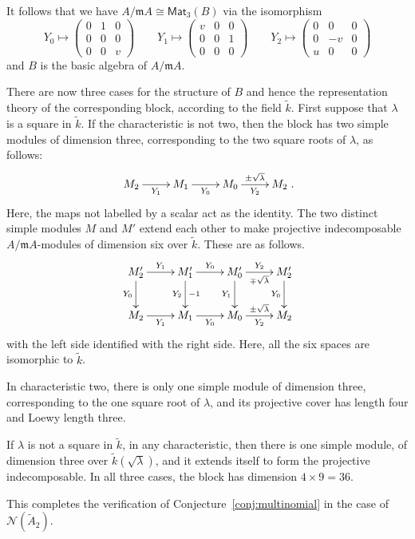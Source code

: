 \documentclass[12pt]{amsart}
\newcommand{\Mat}{\mathsf{Mat}}
\newcommand{\mcN}{\mathcal{N}}
\newcommand{\mfm}{\mathfrak{m}}
\numberwithin{equation}{section}
\theoremstyle{definition}
\begin{document}
It follows that we have $A/\mfm A\cong \Mat_3(B)$ via the isomorphism
\[ Y_0 \mapsto \left(\begin{smallmatrix}
0&1&0\\ 0&0&0 \\ 0&0&v 
\end{smallmatrix}\right)\qquad 
Y_1 \mapsto \left(\begin{smallmatrix}
v&0&0\\ 0&0&1 \\ 0&0&0 
\end{smallmatrix}\right)\qquad 
Y_2 \mapsto \left(\begin{smallmatrix}
0&0&0\\ 0&-v&0 \\ u&0&0 
\end{smallmatrix}\right) \]
and $B$ is the basic algebra of $A/\mfm A$.

There are now
three cases for the structure of $B$ and hence the representation
theory of the corresponding block, according to
the field $\tilde k$. First suppose that $\lambda$ is a square in
$\tilde k$.
If the characteristic is not two, then the block has
two simple modules of dimension three,  corresponding to the
two square roots of $\lambda$, as follows:
\[ \xymatrix{M_2\ar[r]_{Y_1}& M_1\ar[r]_{Y_0}&
    M_0\ar[r]_{Y_2}^{\pm\sqrt\lambda}& M_2}. \]
Here, the maps not labelled by a 
scalar act as the identity.
The two distinct simple modules $M$ and $M'$ extend each
other to make projective indecomposable $A/\mfm A$-modules of dimension six over $\tilde
k$. These are as follows.
\[ \xymatrix{M'_2\ar[r]^{Y_1}\ar[d]_{Y_0}&
M'_1\ar[r]^{Y_0}\ar[d]_{Y_2}^{-1}&
M'_0\ar[r]^{Y_2}_{\mp\sqrt\lambda}\ar[d]_{Y_1} & M'_2\ar[d]_{Y_0} \\
M_2\ar[r]_{Y_1} &M_1\ar[r]_{Y_0}& M_0\ar[r]_{Y_2}^{\pm\sqrt\lambda}&M_2} \]
with the left side identified with the right side. Here, all the six
spaces are isomorphic to $\tilde k$.

In characteristic two, there is only one simple module of dimension
three, corresponding to the one square root of $\lambda$, 
and its projective cover has length four and Loewy length three.

If $\lambda$ is not a square in $\tilde k$, in any characteristic, then there is
one simple module, of dimension three over $\tilde k(\sqrt\lambda)$,
and it extends itself to form the projective indecomposable. In all three cases, the
block has dimension $4 \times 9 = 36$.\bigskip

This completes the verification of Conjecture~\ref{conj:multinomial}
in the case of $\mcN(\tilde A_2)$.
\end{document}
